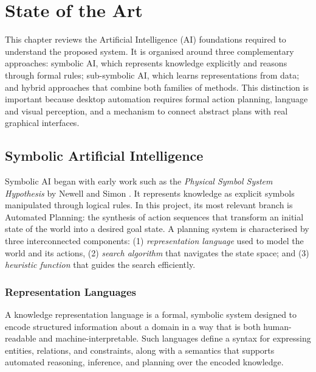 \chapter{State of the Art}
\label{chap:state_of_the_art}
\setcounter{section}{0}

This chapter reviews the Artificial Intelligence (AI) foundations required to understand the proposed system. It is organised around three complementary approaches: symbolic AI, which represents knowledge explicitly and reasons through formal rules; sub-symbolic AI, which learns representations from data; and hybrid approaches that combine both families of methods. This distinction is important because desktop automation requires formal action planning, language and visual perception, and a mechanism to connect abstract plans with real graphical interfaces.

\section{Symbolic Artificial Intelligence}
\label{sec:symbolic_ai}

Symbolic AI began with early work such as the \textit{Physical Symbol System Hypothesis} by Newell and Simon \cite{NewellSimon1976}. It represents knowledge as explicit symbols manipulated through logical rules. In this project, its most relevant branch is Automated Planning: the synthesis of action sequences that transform an initial state of the world into a desired goal state. A planning system is characterised by three interconnected components: (1) \textit{representation language} used to model the world and its actions, (2) \textit{search algorithm} that navigates the state space; and (3) \textit{heuristic function} that guides the search efficiently.

\subsection{Representation Languages}
\label{subsec:planning_representations}
A knowledge representation language is a formal, symbolic system designed to encode structured information about a domain in a way that is both human-readable and machine-interpretable. Such languages define a syntax for expressing entities, relations, and constraints, along with a semantics that supports automated reasoning, inference, and planning over the encoded knowledge.

